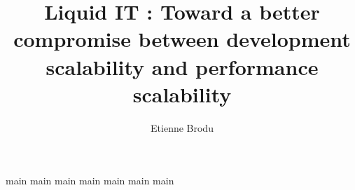 \documentclass[12pt]{report}
\begin{document}
\title{Liquid IT : Toward a better compromise between development scalability and performance scalability }

\author{Etienne Brodu}

\maketitle


\dominitoc%
\tableofcontents

{main}
{main}
{main}
{main}
{main}
{main}
{main}

\printbibliography[]
\end{document}
